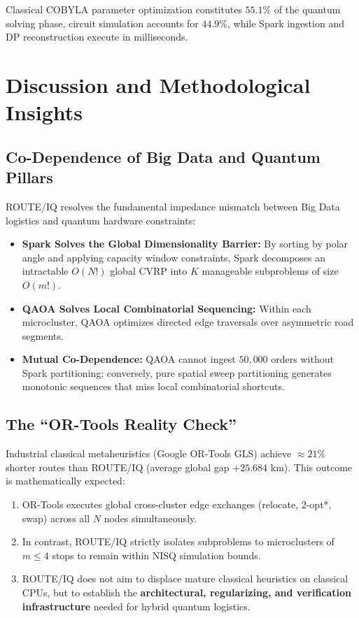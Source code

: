 \documentclass[journal,10pt]{IEEEtran}
\begin{document}
Classical COBYLA parameter optimization constitutes $55.1\%$ of the quantum solving phase, circuit simulation accounts for $44.9\%$, while Spark ingestion and DP reconstruction execute in milliseconds.

\section{Discussion and Methodological Insights}

\subsection{Co-Dependence of Big Data and Quantum Pillars}
ROUTE/IQ resolves the fundamental impedance mismatch between Big Data logistics and quantum hardware constraints:
\begin{itemize}
    \item \textbf{Spark Solves the Global Dimensionality Barrier:} By sorting by polar angle and applying capacity window constraints, Spark decomposes an intractable $O(N!)$ global CVRP into $K$ manageable subproblems of size $O(m!)$.
    \item \textbf{QAOA Solves Local Combinatorial Sequencing:} Within each microcluster, QAOA optimizes directed edge traversals over asymmetric road segments.
    \item \textbf{Mutual Co-Dependence:} QAOA cannot ingest $50,000$ orders without Spark partitioning; conversely, pure spatial sweep partitioning generates monotonic sequences that miss local combinatorial shortcuts.
\end{itemize}

\subsection{The ``OR-Tools Reality Check''}
Industrial classical metaheuristics (Google OR-Tools GLS) achieve $\approx 21\%$ shorter routes than ROUTE/IQ (average global gap $+25.684\text{ km}$). This outcome is mathematically expected:
\begin{enumerate}
    \item OR-Tools executes global cross-cluster edge exchanges (relocate, 2-opt*, swap) across all $N$ nodes simultaneously.
    \item In contrast, ROUTE/IQ strictly isolates subproblems to microclusters of $m \le 4$ stops to remain within NISQ simulation bounds.
    \item ROUTE/IQ does not aim to displace mature classical heuristics on classical CPUs, but to establish the \textbf{architectural, regularizing, and verification infrastructure} needed for hybrid quantum logistics.
\end{enumerate}
\end{document}

